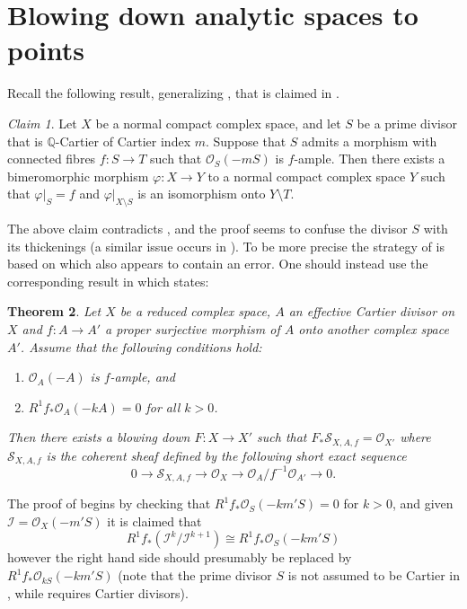 \documentclass[12pt]{amsart}
\theoremstyle{plain}
\newtheorem{theorem}{Theorem}[section]
\theoremstyle{remark}
\theoremstyle{definition}
\newcommand{\<}{\leq}
\newcommand{\OO}{{\mathcal{O}}}
\newcommand{\Q}{{\mathbb{Q}}}
\theoremstyle{definition}
\theoremstyle{definition}
\numberwithin{equation}{section}
\theoremstyle{remark}
\newtheorem{claim}[theorem]{Claim}
\begin{document}
\section{Blowing down analytic spaces to points}\label{sec:point-contractions}
Recall the following result, generalizing \cite{Gra62}, that is claimed in \cite[Proposition 7.4]{HP16}.
\begin{claim}\label{c-HP16} Let $X$ be a normal compact complex space, and let $S$
be a prime divisor that is $\Q$-Cartier of Cartier index $m$. Suppose that $S$
admits a morphism with connected fibres $f: S \to T$ such that $\mathcal O _S (-mS)$
is $f$-ample. Then there exists a bimeromorphic morphism $\varphi :X\to Y$  to
a normal compact complex space $Y$ such that $\varphi|_S = f$ and $\varphi|_{X\setminus S}$ is an
isomorphism onto $Y \setminus T$.
\end{claim}
The above claim contradicts \cite[Proposition 3]{Fuj74}, and the proof seems to confuse the divisor $S$ with its thickenings (a similar issue occurs in \cite{CHP16}). To be more precise the strategy of \cite[Proposition 7.4]{HP16} is based on \cite{AT84} which also appears to contain an error. One should instead use the corresponding result in \cite[Theorem 2]{Fuj74} which states:
\begin{theorem}\cite[Theorem 2]{Fuj74}\label{t-fuj74}
Let $X$ be a reduced complex space, $A$ an effective Cartier
divisor on $X$ and $f: A\to A'$ a proper surjective morphism of $A$ onto another
complex space $A'$.  Assume that the following conditions hold:
\begin{enumerate}
    \item $\mathcal O _A(-A)$ is $f$-ample, and
    \item $R^1f_*\OO _A(-kA)=0$ for all $k>0$. 
\end{enumerate}
Then there exists a blowing down $F:X\to X'$ such that $F_*\mathcal S_{X,A,f}=\OO _{X'}$ where $\mathcal S_{X,A,f}$ is the coherent sheaf defined by the following short exact sequence
\[ 0\to \mathcal S_{X,A,f}\to \OO _X \to \OO _A/f^{-1}\OO _{A'}\to 0.\] 
\end{theorem}
The proof of \cite[Proposition 7.4]{HP16} begins by checking that $R^1f_* \OO _S(-km'S)=0$ for $k>0$, and given $\mathcal I =\OO _X(-m'S)$ it is claimed that 
\[R^1f_* (\mathcal I^k/\mathcal I^{k+1})\cong R^1f_*\OO _S(-km'S)\] however the right hand side should presumably be replaced by $R^1f_*\OO _{kS}(-km'S)$ (note that the prime divisor $S$ is not assumed to be Cartier in \cite{HP16}, while \cite[Theorem 2]{Fuj74} requires Cartier divisors).
\end{document}

